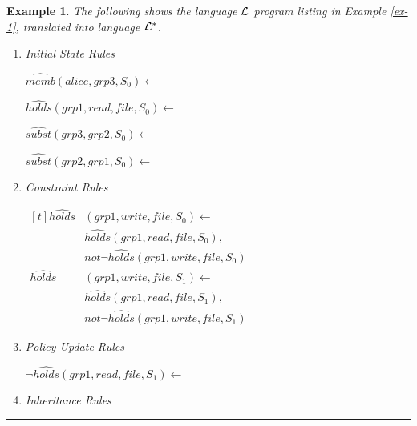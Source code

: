 \documentclass[11pt, twocolumn]{article}
\newtheorem{vexmpl}{Example}
\newenvironment{vexample}
  {\begin{vexmpl}\rm}
  {\rule{2mm}{2mm}\end{vexmpl}}
\begin{document}
        \begin{vexample}
          \label{ex-2}
          The following shows the language ${\cal L}$ program listing in
          Example \ref{ex-1},  translated into language ${\cal L}^{*}$.

          \begin{enumerate}
            \item
              Initial State Rules

              $\hat{memb}(alice, grp3, S_{0}) \leftarrow$

              $\hat{holds}(grp1, read, file,S_{0}) \leftarrow$

              $\hat{subst}(grp3, grp2, S_{0}) \leftarrow$

              $\hat{subst}(grp2, grp1, S_{0}) \leftarrow$

            \item
              Constraint Rules

              \begin{math}
                \begin{aligned}[t]
                  \hat{holds}&(grp1, write, file, S_{0}) \leftarrow \\
                  & \hat{holds}(grp1, read, file, S_{0}), \\
                  & not \lnot \hat{holds}(grp1, write, file, S_{0}) \\
                  \hat{holds}&(grp1, write, file, S_{1}) \leftarrow \\
                  & \hat{holds}(grp1, read, file, S_{1}), \\
                  & not \lnot \hat{holds}(grp1, write, file, S_{1})
                \end{aligned}
              \end{math}

            \item
              Policy Update Rules

              \begin{math}
                \lnot \hat{holds}(grp1, read, file, S_{1}) \leftarrow
              \end{math}

            \item
              Inheritance Rules


\end{enumerate}
\end{vexample}
\end{document}
